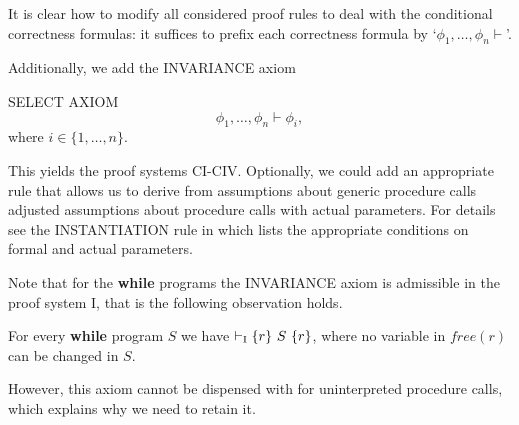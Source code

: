 \documentclass[runningheads]{llncs}       %
\begin{document}
It is clear how to modify all considered proof rules to deal with the
conditional correctness formulas: it suffices to prefix each
correctness formula by `$\phi_1, \dots, \phi_n \vdash$'.  







Additionally, we add the INVARIANCE axiom
\III

\NI
SELECT AXIOM
\[
\phi_1, \dots, \phi_n \vdash \phi_i,
\]
where $i \in \{1, \dots, n\}$.
\III

This yields the proof systems CI-CIV.
Optionally, we could add an appropriate rule that allows us to
derive from assumptions about generic procedure calls adjusted
assumptions about procedure calls with actual parameters.  For details
see the INSTANTIATION rule in \cite[page 159]{ABO09} which lists the
appropriate conditions on formal and actual parameters.

Note that for the \textbf{while} programs the INVARIANCE axiom is admissible in the proof system I, that is the following
observation holds.

\begin{note} \label{note:1}
  For every \textbf{while} program $S$ we have
  $\vdash_{\mathrm{I}} \mbox{$\{{r}\}\ {S}\ \{{r}\}$}$, where no variable in
  $\mathit{free}(r)$ can be changed in $S$.

\end{note}

However, this axiom cannot be dispensed with for uninterpreted procedure calls, which explains why we
need to retain it.
\end{document}
